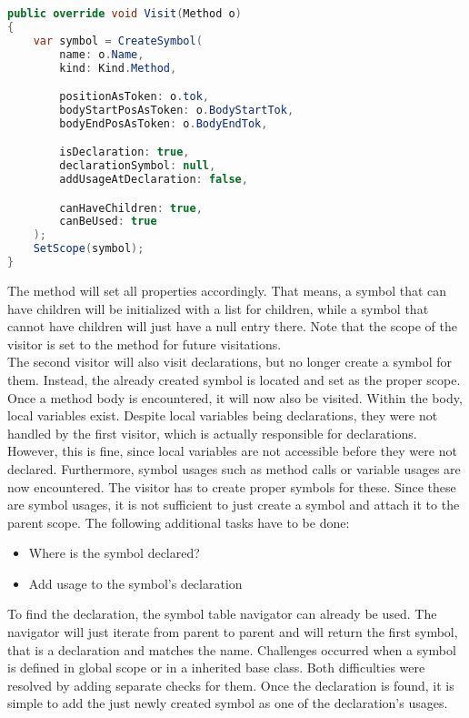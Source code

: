\begin{lstlisting}[language=csharp, caption={Visiting a Method}, captionpos=b, label={lst:visitorvisit1}]
public override void Visit(Method o)
{
    var symbol = CreateSymbol(
        name: o.Name,
        kind: Kind.Method,

        positionAsToken: o.tok,
        bodyStartPosAsToken: o.BodyStartTok,
        bodyEndPosAsToken: o.BodyEndTok,

        isDeclaration: true,
        declarationSymbol: null,
        addUsageAtDeclaration: false,

        canHaveChildren: true,
        canBeUsed: true
    );
    SetScope(symbol);
}
\end{lstlisting}

The  method will set all properties accordingly.
That means, a symbol that can have children will be initialized with a list for children, while a symbol that cannot have children will just have a null entry there.
Note that the scope of the visitor is set to the method for future visitations.\\

The second visitor will also visit declarations, but no longer create a symbol for them.
Instead, the already created symbol is located and set as the proper scope.
Once a method body is encountered, it will now also be visited.
Within the body, local variables exist.
Despite local variables being declarations, they were not handled by the first visitor, which is actually responsible for declarations.
However, this is fine, since local variables are not accessible before they were not declared.
Furthermore, symbol usages such as method calls or variable usages are now encountered.
The visitor has to create proper symbols for these.
Since these are symbol usages, it is not sufficient to just create a symbol and attach it to the parent scope.
The following additional tasks have to be done:
\begin{itemize}
    \item Where is the symbol declared?
    \item Add usage to the symbol's declaration
\end{itemize}

To find the declaration, the symbol table navigator can already be used.
The navigator will just iterate from parent to parent and will return the first symbol, that is a declaration and matches the name.
Challenges occurred when a symbol is defined in global scope or in a inherited base class.
Both difficulties were resolved by adding separate checks for them.
Once the declaration is found, it is simple to add the just newly created symbol as one of the declaration's usages.\\


